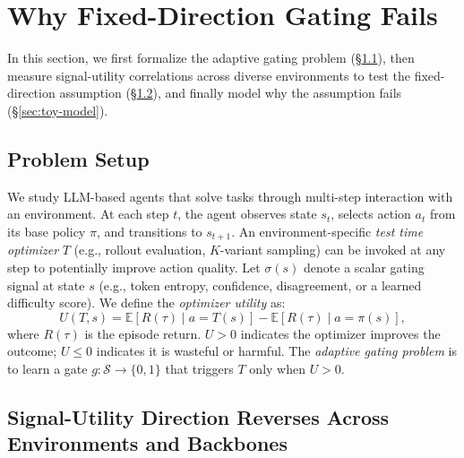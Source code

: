 \vspace{-0.1in}
\section{Why Fixed-Direction Gating Fails}
\label{sec:signal-landscape}
\vspace{-0.1in}
In this section, we first formalize the adaptive gating problem (\S\ref{sec:setup}), then measure signal-utility correlations across diverse environments to test the fixed-direction assumption (\S\ref{sec:empirical-landscape}), and finally model why the assumption fails (\S\ref{sec:toy-model}).

\vspace{-0.1in}
\subsection{Problem Setup}
\label{sec:setup}
We study LLM-based agents that solve tasks through multi-step interaction with an environment. At each step $t$, the agent observes state $s_t$, selects action $a_t$ from its base policy $\pi$, and transitions to $s_{t+1}$. An environment-specific \emph{test time optimizer} $T$ (e.g., rollout evaluation, $K$-variant sampling) can be invoked at any step to potentially improve action quality. Let $\sigma(s)$ denote a scalar gating signal at state $s$ (e.g., token entropy, confidence, disagreement, or a learned difficulty score). We define the \emph{optimizer utility} as:
\begin{equation}
  U(T, s) = \mathbb{E}[R(\tau) \mid a{=}T(s)] - \mathbb{E}[R(\tau) \mid a{=}\pi(s)],
  \label{eq:utility}
\end{equation}
where $R(\tau)$ is the episode return. $U > 0$ indicates the optimizer improves the outcome; $U \leq 0$ indicates it is wasteful or harmful. The \emph{adaptive gating problem} is to learn a gate $g: \mathcal{S} \to \{0, 1\}$ that triggers $T$ only when $U > 0$.

\subsection{Signal-Utility Direction Reverses Across Environments and Backbones}
\label{sec:empirical-landscape}

